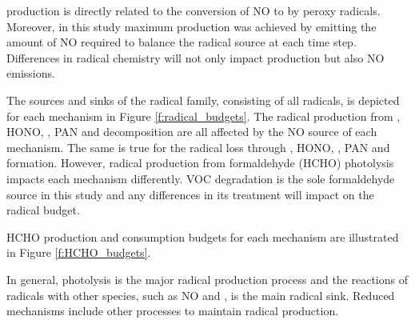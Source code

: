 

 production is directly related to the conversion of NO to  by peroxy radicals. 
Moreover, in this study maximum  production was achieved by emitting the amount of NO required to balance the radical source at each time step. 
Differences in radical chemistry will not only impact  production but also NO emissions.

The sources and sinks of the radical family, consisting of all radicals, is depicted for each mechanism in Figure \ref{f:radical_budgets}.
The radical production from , HONO, , PAN and  decomposition are all affected by the NO source of each mechanism.
The same is true for the radical loss through , HONO, , PAN and  formation.
However, radical production from formaldehyde (HCHO) photolysis impacts each mechanism differently.
VOC degradation is the sole formaldehyde source in this study and any differences in its treatment will impact on the radical budget.

HCHO production and consumption budgets for each mechanism are illustrated in Figure \ref{f:HCHO_budgets}.

In general, photolysis is the major radical production process and the reactions of radicals with other species, such as NO and , is the main radical sink. 
Reduced mechanisms include other processes to maintain radical production.

